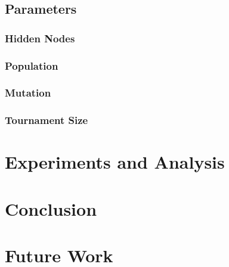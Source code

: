 \documentclass[sigconf]{acmart}
\begin{document}
\subsection{Parameters}
\subsubsection{Hidden Nodes}
\subsubsection{Population}
\subsubsection{Mutation}
\subsubsection{Tournament Size}
\section{Experiments and Analysis}
\section{Conclusion}
\section{Future Work}


 
\end{document}
